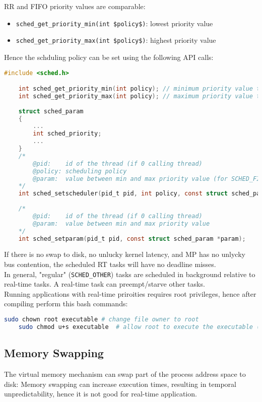 RR and FIFO priority values are comparable:
\begin{itemize}
    \item \texttt{sched\_get\_priority\_min(int \$policy\$)}: lowest priority value
    \item \texttt{sched\_get\_priority\_max(int \$policy\$)}: highest priority value
\end{itemize}

Hence the schduling policy can be set using the following API calls:
\begin{lstlisting}[language=C]
    #include <sched.h>  

    int sched_get_priority_min(int policy); // minimum priority value that can be used by the policy
    int sched_get_priority_max(int policy); // maximum priority value that can be used by the policy
    
    struct sched_param
    {
        ...
        int sched_priority;
        ...
    }
    /*
        @pid:    id of the thread (if 0 calling thread)
        @policy: scheduling policy
        @param:  value between min and max priority value (for SCHED_FIFO and SCHED_RR)
    */
    int sched_setscheduler(pid_t pid, int policy, const struct sched_param *param);
    
    /*
        @pid:    id of the thread (if 0 calling thread)
        @param:  value between min and max priority value 
    */
    int sched_setparam(pid_t pid, const struct sched_param *param);

\end{lstlisting}

If there is no swap to disk, no unlucky kernel latency, and MP has no unlycky bus contention, the scheduled RT tasks will have no deadline misses.\\
In general, "regular" (\texttt{SCHED\_OTHER}) tasks are scheduled in background relative to real-time tasks. A real-time task can preempt/starve other tasks.\\
Running applications with real-time priroities requires root privileges, hence after compiling perform this bash commands:
\begin{lstlisting}[language=bash]
    sudo chown root executable # change file owner to root
    sudo chmod u+s executable  # allow root to execute the executable (not the user)
\end{lstlisting}

\subsection{Memory Swapping}
The virtual memory mechanism can swap part of the process address space to disk: Memory swapping can increase execution times, resulting in temporal unpredictability, hence it is not good for real-time application.

